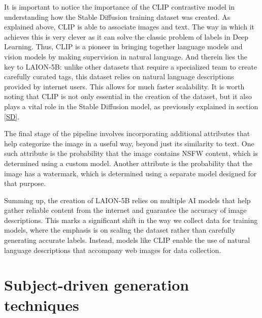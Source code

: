 It is important to notice the importance of the CLIP contrastive model in understanding how the Stable Diffusion training dataset was created. As explained above, CLIP is able to associate images and text. The way in which it achieves this is very clever as it can solve the classic problem of labels in Deep Learning. Thus, CLIP is a pioneer in bringing together language models and vision models by making supervision in natural language. And therein lies the key to LAION-5B: unlike other datasets that require a specialized team to create carefully curated tags, this dataset relies on natural language descriptions provided by internet users. This allows for much faster scalability. It is worth noting that CLIP is not only essential in the creation of the dataset, but it also plays a vital role in the Stable Diffusion model, as previously explained in section \ref{SD}.

The final stage of the pipeline involves incorporating additional attributes that help categorize the image in a useful way, beyond just its similarity to text. One such attribute is the probability that the image contains NSFW content, which is determined using a custom model. Another attribute is the probability that the image has a watermark, which is determined using a separate model designed for that purpose.

Summing up, the creation of LAION-5B relies on multiple AI models that help gather reliable content from the internet and guarantee the accuracy of image descriptions. This marks a significant shift in the way we collect data for training models, where the emphasis is on scaling the dataset rather than carefully generating accurate labels. Instead, models like CLIP enable the use of natural language descriptions that accompany web images for data collection.

\section{Subject-driven generation techniques}

